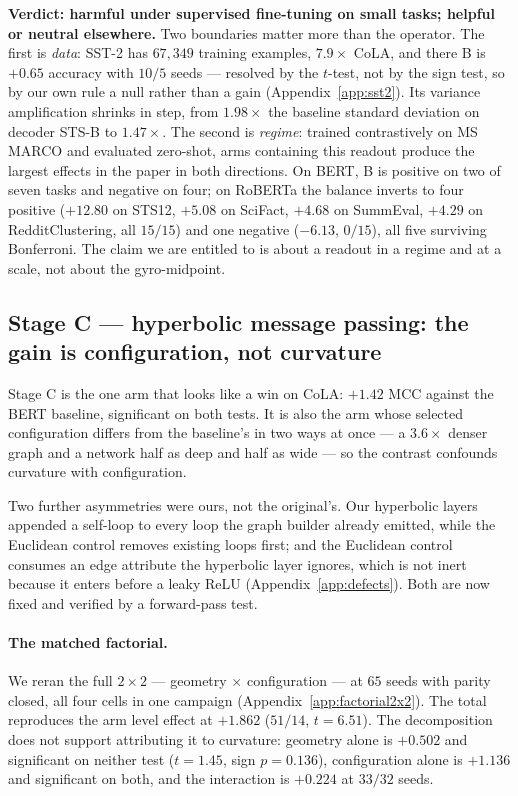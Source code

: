 \documentclass{article}
\begin{document}
\textbf{Verdict: harmful under supervised fine-tuning on small tasks; helpful
or neutral elsewhere.} Two boundaries matter more than the operator. The first
is \emph{data}: SST-2 has $67{,}349$ training examples, $7.9\times$ CoLA, and
there B is $+0.65$ accuracy with $10/5$ seeds --- resolved by the $t$-test, not
by the sign test, so by our own rule a null rather than a gain
(Appendix~\ref{app:sst2}). Its variance amplification shrinks in step, from
$1.98\times$ the baseline standard deviation on decoder STS-B to $1.47\times$.
The second is \emph{regime}: trained contrastively on MS MARCO and evaluated
zero-shot, arms containing this readout produce the largest effects in the paper
in both directions. On BERT, B is positive on two of seven tasks and negative on
four; on RoBERTa the balance inverts to four positive ($+12.80$ on STS12,
$+5.08$ on SciFact, $+4.68$ on SummEval, $+4.29$ on RedditClustering, all
$15/15$) and one negative ($-6.13$, $0/15$), all five surviving Bonferroni. The
claim we are entitled to is about a readout in a regime and at a scale, not
about the gyro-midpoint.

\subsection{Stage C --- hyperbolic message passing: the gain is configuration, not curvature}
\label{sec:stageC}

Stage C is the one arm that looks like a win on CoLA: $+1.42$ MCC against the
BERT baseline, significant on both tests. It is also the arm whose selected
configuration differs from the baseline's in two ways at once --- a
$3.6\times$ denser graph and a network half as deep and half as wide --- so the
contrast confounds curvature with configuration.

Two further asymmetries were ours, not the original's. Our hyperbolic layers
appended a self-loop to every loop the graph builder already emitted, while the
Euclidean control removes existing loops first; and the Euclidean control
consumes an edge attribute the hyperbolic layer ignores, which is not inert
because it enters before a leaky ReLU (Appendix~\ref{app:defects}). Both are
now fixed and verified by a forward-pass test.

\paragraph{The matched factorial.} We reran the full $2\times2$ --- geometry
$\times$ configuration --- at $65$ seeds with parity closed, all four cells in
one campaign (Appendix~\ref{app:factorial2x2}). The total reproduces the arm
level effect at $+1.862$ ($51/14$, $t=6.51$). The decomposition does not
support attributing it to curvature: geometry alone is $+0.502$ and significant
on neither test ($t=1.45$, sign $p=0.136$), configuration alone is $+1.136$ and
significant on both, and the interaction is $+0.224$ at $33/32$ seeds.
\end{document}
